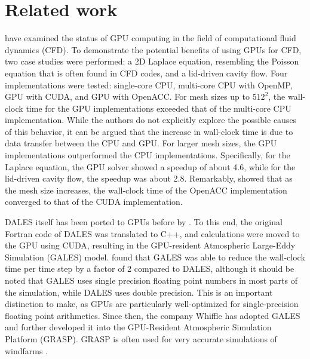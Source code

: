 \section{Related work}

\citet{niemeyerRecentProgressChallenges2014} have examined the status of GPU computing in the field of computational fluid dynamics (CFD). To demonstrate the potential benefits of using GPUs for CFD, two case studies were performed: a 2D Laplace equation, resembling the Poisson equation that is often found in CFD codes, and a lid-driven cavity flow. Four implementations were tested: single-core CPU, multi-core CPU with OpenMP, GPU with CUDA, and GPU with OpenACC. For mesh sizes up to $512^2$, the wall-clock time for the GPU implementations exceeded that of the multi-core CPU implementation. While the authors do not explicitly explore the possible causes of this behavior, it can be argued that the increase in wall-clock time is due to data transfer between the CPU and GPU. For larger mesh sizes, the GPU implementations outperformed the CPU implementations. Specifically, for the Laplace equation, the GPU solver showed a speedup of about 4.6, while for the lid-driven cavity flow, the speedup was about 2.8. Remarkably, \citet{niemeyerRecentProgressChallenges2014} showed that as the mesh size increases, the wall-clock time of the OpenACC implementation converged to that of the CUDA implementation.

DALES itself has been ported to GPUs before by \citet{schalkwijkHighPerformanceSimulationsTurbulent2012}. To this end, the original Fortran code of DALES was translated to C++, and calculations were moved to the GPU using CUDA, resulting in the GPU-resident Atmospheric Large-Eddy Simulation (GALES) model. \citet{schalkwijkHighPerformanceSimulationsTurbulent2012} found that GALES was able to reduce the wall-clock time per time step by a factor of 2 compared to DALES, although it should be noted that GALES uses single precision floating point numbers in most parts of the simulation, while DALES uses double precision. This is an important distinction to make, as GPUs are particularly well-optimized for single-precision floating point arithmetics. Since then, the company Whiffle has adopted GALES and further developed it into the GPU-Resident Atmospheric Simulation Platform (GRASP). GRASP is often used for very accurate simulations of windfarms \citep{verzijlberghAtmosphericFlowsLarge2021}.


